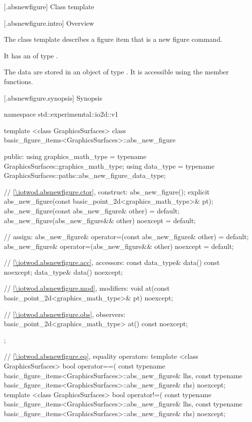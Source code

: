  [\iotwod.absnewfigure] {Class template }

 [\iotwod.absnewfigure.intro] {Overview}

\pnum
{}%
The class template  describes a figure item that is a new figure command.

%
\pnum
It has an  of type .

\pnum
The data are stored in an object of type . It is accessible using the  member functions.

 [\iotwod.absnewfigure.synopsis] {Synopsis}
\begin{codeblock}
namespace std::experimemtal::io2d::v1 {
  template <class GraphicsSurfaces>
  class basic_figure_items<GraphicsSurfaces>::abs_new_figure {
  public:
    using graphics_math_type = typename GraphicsSurfaces::graphics_math_type;
    using data_type =
      typename GraphicsSurfaces::paths::abs_new_figure_data_type;

    // \ref{\iotwod.absnewfigure.ctor}, construct:
    abs_new_figure();
    explicit abs_new_figure(const basic_point_2d<graphics_math_type>& pt);
    abs_new_figure(const abs_new_figure& other) = default;
    abs_new_figure(abs_new_figure&& other) noexcept = default;

    // assign:
    abs_new_figure& operator=(const abs_new_figure& other) = default;
    abs_new_figure& operator=(abs_new_figure&& other) noexcept = default;

    // \ref{\iotwod.absnewfigure.acc}, accessors:
    const data_type& data() const noexcept;
    data_type& data() noexcept;

    // \ref{\iotwod.absnewfigure.mod}, modifiers:
    void at(const basic_point_2d<graphics_math_type>& pt) noexcept;

    // \ref{\iotwod.absnewfigure.obs}, observers:
    basic_point_2d<graphics_math_type> at() const noexcept;
  };
  
  // \ref{\iotwod.absnewfigure.eq}, equality operators:
  template <class GraphicsSurfaces>
  bool operator==(
    const typename basic_figure_items<GraphicsSurfaces>::abs_new_figure& lhs,
    const typename basic_figure_items<GraphicsSurfaces>::abs_new_figure& rhs) 
    noexcept;  
  template <class GraphicsSurfaces>
  bool operator!=(
    const typename basic_figure_items<GraphicsSurfaces>::abs_new_figure& lhs,
    const typename basic_figure_items<GraphicsSurfaces>::abs_new_figure& rhs) 
    noexcept;  
}
\end{codeblock}

